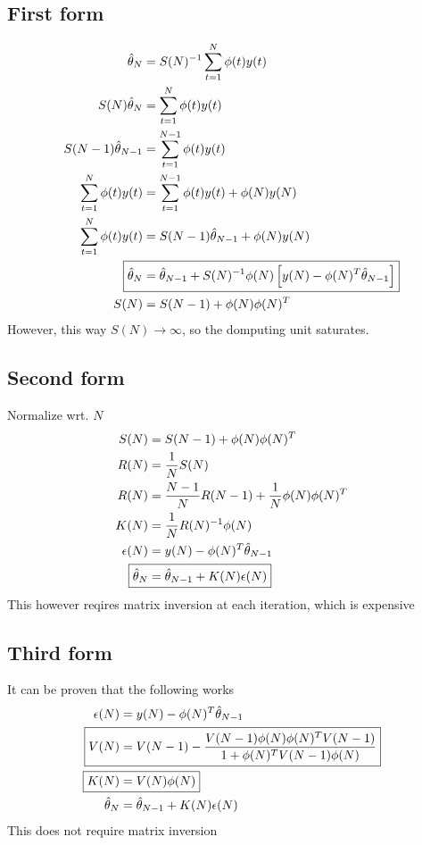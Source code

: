 \documentclass{article}
\begin{document}
\subsection{First form}
\begin{align*}
\hat{\theta}_N&=S(N)^{-1}\sum_{t=1}^N \phi(t)y(t)\\
S(N)\hat{\theta}_N&=\sum_{t=1}^N \phi(t)y(t)\\
S(N-1)\hat{\theta}_{N-1}&=\sum_{t=1}^{N-1} \phi(t)y(t)\\
\sum_{t=1}^N \phi(t)y(t)&=\sum_{t=1}^{N-1} \phi(t)y(t)+\phi(N)y(N)\\
\sum_{t=1}^N \phi(t)y(t)&=S(N-1)\hat{\theta}_{N-1}+\phi(N)y(N)\\
\Aboxed{
\hat{\theta}_N&=\hat{\theta}_{N-1}+S(N)^{-1}\phi(N)\left[y(N)-\phi(N)^T\hat{\theta}_{N-1}\right]
}\\
S(N)&=S(N-1)+\phi(N)\phi(N)^T
\end{align*}
However, this way $S(N)\to\infty$, so the domputing unit saturates.
\subsection{Second form} Normalize wrt. $N$
\begin{align*}
S(N)&=S(N-1)+\phi(N)\phi(N)^T\\
R(N)&=\frac{1}{N}S(N)\\
R(N)&=\frac{N-1}{N}R(N-1)+\frac{1}{N}\phi(N)\phi(N)^T\\
K(N)&=\frac{1}{N}R(N)^{-1}\phi(N)\\
\epsilon(N)&=y(N)-\phi(N)^T\hat{\theta}_{N-1}\\
\Aboxed{
\hat{\theta}_N&=\hat{\theta}_{N-1}+K(N)\epsilon(N)
}
\end{align*}
This however reqires matrix inversion at each iteration, which is expensive
\subsection{Third form} 
It can be proven that the following works
\begin{align*}
\epsilon(N)&=y(N)-\phi(N)^T\hat{\theta}_{N-1}\\
\Aboxed{
V(N)&=V(N-1)-
\frac{
	V(N-1)\phi(N)\phi(N)^TV(N-1)
}{
	1+\phi(N)^TV(N-1)\phi(N)
}
}\\
\Aboxed{
K(N)&=V(N)\phi(N)
}\\
\hat{\theta}_N&=\hat{\theta}_{N-1}+K(N)\epsilon(N)
\end{align*}
This does not require matrix inversion
\end{document}
